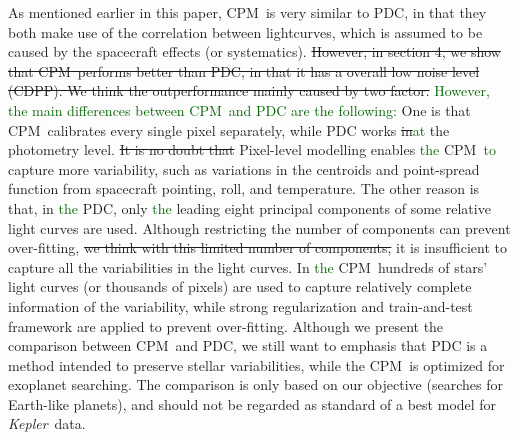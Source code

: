 \documentclass[12pt, preprint]{aastex}
\newcommand{\project}[1]{\textsl{#1}}
\newcommand{\Kepler}{\project{Kepler}}
\newcommand{\name}{CPM}
\newcommand{\revise}[1]{\textcolor{darkgreen}{#1}}
\newcommand{\remove}[1]{\sout{#1}}
\begin{document}
As mentioned earlier in this paper, \name\ is very similar to PDC, in that they both make use of the correlation between lightcurves, which is assumed to be caused by the spacecraft effects (or systematics).
\remove{However, in section 4, we show that \name\ performs better than PDC, in that it has a overall low noise level (CDPP).
We think the outperformance mainly caused by two factor.}
\revise{However, the main differences between \name\ and PDC are the following:}
One is that \name\ calibrates every single pixel separately, 
  while PDC works \remove{in}\revise{at} the photometry level.
\remove{It is no doubt that} Pixel-level modelling enables \revise{the} \name\ \revise{to} capture more variability, such as 
variations in the centroids and point-spread function from spacecraft pointing, roll, and temperature.
The other reason is that, in \revise{the} PDC,  only \revise{the} leading eight principal components of some relative light curves are used.
Although restricting the number of components can prevent over-fitting, \remove{we think with this limited number of components,} it is insufficient to capture all the variabilities in the light curves.
In \revise{the} \name\, hundreds of stars' light curves (or thousands of pixels) are used to capture relatively complete information of the variability, while strong regularization and train-and-test framework are applied to prevent over-fitting.
Although we present the comparison between \name\ and PDC, 
  we still want to emphasis that PDC is a method intended to preserve stellar variabilities, 
  while the \name\ is optimized for exoplanet searching. 
The comparison is only based on our objective (searches for Earth-like planets), 
  and should not be regarded as standard of a best model for \Kepler\ data.
  
\end{document}
